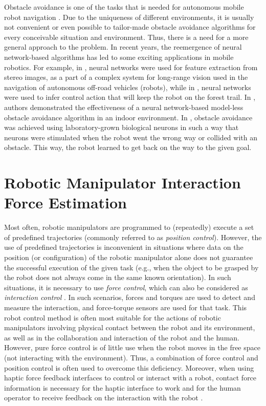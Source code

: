 Obstacle avoidance is one of the tasks that is needed for autonomous mobile robot navigation \cite{Sullivan2017}. Due to the uniqueness of different environments, it is usually not convenient or even possible to tailor-made obstacle avoidance algorithms for every conceivable situation and environment. Thus, there is a need for a more general approach to the problem. In recent years, the reemergence of neural network-based algorithms has led to some exciting applications in mobile robotics. For example, in \cite{Hadsell2009}, neural networks were used for feature extraction from stereo images, as a part of a complex system for long-range vision used in the navigation of autonomous off-road vehicles (robots), while in \cite{Giusti2016}, neural networks were used to infer control action that will keep the robot on the forest trail. In \cite{Tai2016}, authors demonstrated the effectiveness of a neural network-based model-less obstacle avoidance algorithm in an indoor environment. In \cite{Yada2021}, obstacle avoidance was achieved using laboratory-grown biological neurons in such a way that neurons were stimulated when the robot went the wrong way or collided with an obstacle. This way, the robot learned to get back on the way to the given goal.

\section{Robotic Manipulator Interaction Force Estimation}

Most often, robotic manipulators are programmed to (repeatedly) execute a set of predefined trajectories (commonly referred to as \emph{position control}).  However, the use of predefined trajectories is inconvenient in situations where data on the position (or configuration) of the robotic manipulator alone does not guarantee the successful execution of the given task (e.g., when the object to be grasped by the robot does not always come in the same known orientation). In such situations, it is necessary to use \emph{force control}, which can also be considered as \emph{interaction control} \cite{Siciliano1999}. In such scenarios, forces and torques are used to detect and measure the interaction, and force-torque sensors are used for that task. This robot control method is often most suitable for the actions of robotic manipulators involving physical contact between the robot and its environment, as well as in the collaboration and interaction of the robot and the human. However, pure force control is of little use when the robot moves in the free space (not interacting with the environment). Thus, a combination of force control and position control is often used to overcome this deficiency. Moreover, when using haptic force feedback interfaces to control or interact with a robot, contact force information is necessary for the haptic interface to work and for the human operator to receive feedback on the interaction with the robot \cite{Song2019}.

